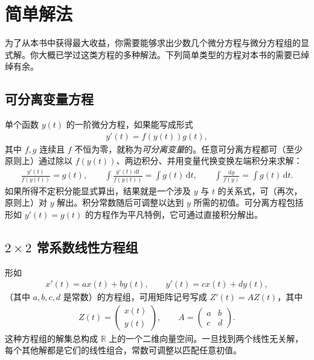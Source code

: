 \documentclass[../../main.tex]{subfiles}
\begin{document}
\section{简单解法}\label{section:appD-simple-solution-techniques}

为了从本书中获得最大收益，你需要能够求出少数几个微分方程与微分方程组的显式解。你大概已学过这类方程的多种解法。下列简单类型的方程对本书的需要已绰绰有余。

\subsection*{可分离变量方程}

单个函数 $y(t)$ 的一阶微分方程，如果能写成形式
\begin{align*}
y'(t)=f(y(t))g(t),
\end{align*}
其中 $f,g$ 连续且 $f$ 不恒为零，就称为\emph{可分离变量}的。任意可分离方程都可（至少原则上）通过除以 $f(y(t))$、两边积分、并用变量代换变换左端积分来求解：
\begin{align*}
\frac{y'(t)}{f(y(t))}=g(t),\qquad
\int\frac{y'(t)\,\mathrm{d}t}{f(y(t))}=\int g(t)\,\mathrm{d}t,\qquad
\int\frac{\mathrm{d}y}{f(y)}=\int g(t)\,\mathrm{d}t.
\end{align*}
如果所得不定积分能显式算出，结果就是一个涉及 $y$ 与 $t$ 的关系式，可（再次，原则上）对 $y$ 解出。积分常数随后可调整以达到 $y$ 所需的初值。可分离方程包括形如 $y'(t)=g(t)$ 的方程作为平凡特例，它可通过直接积分解出。

\subsection*{$2\times2$ 常系数线性方程组}

形如
\begin{align}\label{align:appD-linear-system}
x'(t)=ax(t)+by(t),\qquad y'(t)=cx(t)+dy(t),
\end{align}
（其中 $a,b,c,d$ 是常数）的方程组，可用矩阵记号写成 $Z'(t)=AZ(t)$，其中
\begin{align*}
Z(t)=\begin{pmatrix}x(t)\\ y(t)\end{pmatrix},\qquad
A=\begin{pmatrix}a&b\\ c&d\end{pmatrix}.
\end{align*}
这种方程组的解集总构成 $\mathbb R$ 上的一个二维向量空间。一旦找到两个线性无关解，每个其他解都是它们的线性组合，常数可调整以匹配任意初值。
\end{document}
